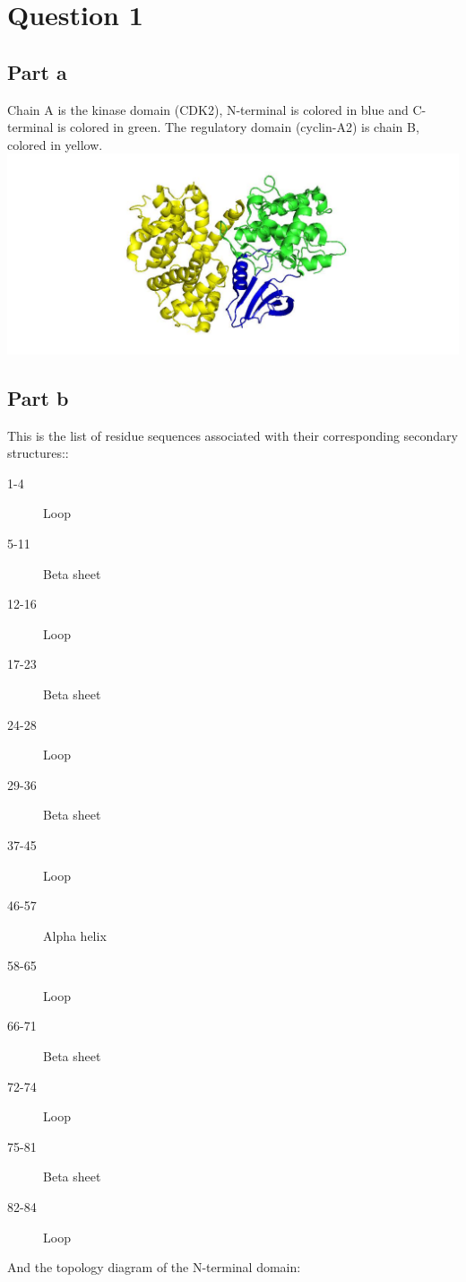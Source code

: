 \documentclass[11pt, a4paper,titlepage]{article}
\begin{document}

\setcounter{tocdepth}{3}
\tableofcontents
\clearpage


\section{Question 1}
\subsection{Part a}

Chain A is the kinase domain (CDK2), N-terminal is colored in blue and
C-terminal is colored in green.  The regulatory domain (cyclin-A2) is
chain B, colored in yellow.
\includegraphics[width=15cm]{./Figures/1a.jpg}

\subsection{Part b}
This is the list of residue sequences associated with their
corresponding secondary structures::
\begin{description}
\item[1-4] Loop
\item[5-11] Beta sheet
\item[12-16] Loop
\item[17-23] Beta sheet
\item[24-28] Loop
\item[29-36] Beta sheet
\item[37-45] Loop
\item[46-57] Alpha helix
\item[58-65] Loop
\item[66-71] Beta sheet
\item[72-74] Loop
\item[75-81] Beta sheet
\item[82-84] Loop
\end{description}
And the topology diagram of the N-terminal domain:
\end{document}

